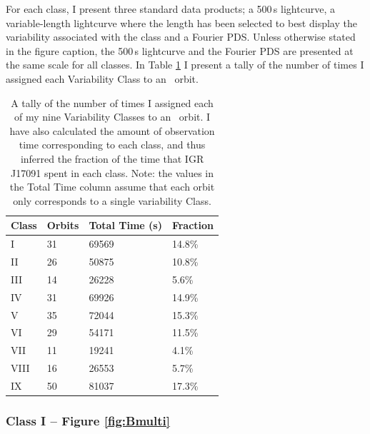 \par For each class, I present three standard data products; a 500\,s lightcurve, a variable-length lightcurve where the length has been selected to best display the variability associated with the class and a Fourier PDS.  Unless otherwise stated in the figure caption, the 500\,s lightcurve and the Fourier PDS are presented at the same scale for all classes.  In Table \ref{tab:CPopD} I present a tally of the number of times I assigned each Variability Class to an \rxte\ orbit.

\begin{table}
\centering
\begin{tabular}{llll}
\hline
\hline
\scriptsize Class &\scriptsize  Orbits &\scriptsize Total Time (s) &\scriptsize Fraction \\
\hline
I & 31 &  69569 & 14.8\%\\
II & 26 &  50875 & 10.8\%\\
III & 14 &  26228 & 5.6\%\\
IV & 31 &  69926 & 14.9\%\\
V & 35 &  72044 & 15.3\%\\
VI & 29 &  54171 & 11.5\%\\
VII & 11 &  19241 & 4.1\%\\
VIII & 16 &  26553 & 5.7\%\\
IX & 50 &  81037 & 17.3\%\\
\hline
\hline
\end{tabular}
\caption[A tally of the number of times I assigned each of my nine Variability Classes to an \rxte\ orbit observing IGR J17091.]{A tally of the number of times I assigned each of my nine Variability Classes to an \rxte\ orbit.  I have also calculated the amount of observation time corresponding to each class, and thus inferred the fraction of the time that IGR J17091 spent in each class.  Note: the values in the Total Time column assume that each orbit only corresponds to a single variability Class.}
\label{tab:CPopD}
\end{table}



\subsubsection{Class I --  Figure \ref{fig:Bmulti}}
\label{sec:ClassI}

